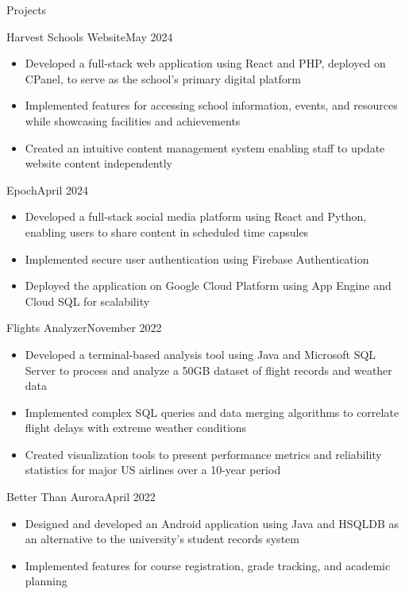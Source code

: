 \documentclass{article}
\newlength{\tabin}
\newlength{\secsep}
\newcommand{\lineunder}{\vspace*{-8pt} \\ \hspace*{-6pt} \hrulefill \\ \vspace*{-15pt}}
\newenvironment{tabbedsection}[1]{
	\begin{list}{}{
		\setlength{\itemsep}{0pt}
		\setlength{\labelsep}{0pt}
		\setlength{\labelwidth}{0pt}
		\setlength{\leftmargin}{\tabin}
		\setlength{\rightmargin}{\tabin}
		\setlength{\listparindent}{0pt}
		\setlength{\parsep}{0pt}
		\setlength{\parskip}{0pt}
		\setlength{\partopsep}{0pt}
		\setlength{\topsep}{#1}
	}
		\item[]
		}{
	\end{list}}
\newenvironment{resume_section}[1]{
	\vspace{2\secsep}
	\textsc{\large#1}
	\lineunder
	\begin{tabbedsection}{\secsep}
	}{\end{tabbedsection}}
\newenvironment{resume_subsection}[2]{
	\filbreak
	\begin{minipage}[t]{0.75\linewidth}
		\textbf{#1}
	\end{minipage}%
	\begin{minipage}[t]{0.25\linewidth}
		\hfill \footnotesize #2
	\end{minipage}
	\begin{tabbedsection}{0.5\secsep}
	}{\end{tabbedsection}}
\newenvironment{subitems}{
	\renewcommand{\labelitemi}{-}
	\begin{itemize}
		\setlength{\labelsep}{1em}
		}{
	\end{itemize}}
\begin{document}
\begin{resume_section}{Projects}
		\begin{resume_subsection}{Harvest Schools Website}{May 2024}
			\begin{subitems}
				\item Developed a full-stack web application using React and PHP, deployed on CPanel, to serve as the school's primary digital platform
				\item Implemented features for accessing school information, events, and resources while showcasing facilities and achievements
				\item Created an intuitive content management system enabling staff to update website content independently
			\end{subitems}
		\end{resume_subsection}
		
		\begin{resume_subsection}{Epoch}{April 2024}
			\begin{subitems}
				\item Developed a full-stack social media platform using React and Python, enabling users to share content in scheduled time capsules
				\item Implemented secure user authentication using Firebase Authentication
				\item Deployed the application on Google Cloud Platform using App Engine and Cloud SQL for scalability
			\end{subitems}
		\end{resume_subsection}
		
		\begin{resume_subsection}{Flights Analyzer}{November 2022}
			\begin{subitems}
				\item Developed a terminal-based analysis tool using Java and Microsoft SQL Server to process and analyze a 50GB dataset of flight records and weather data
				\item Implemented complex SQL queries and data merging algorithms to correlate flight delays with extreme weather conditions
				\item Created visualization tools to present performance metrics and reliability statistics for major US airlines over a 10-year period
			\end{subitems}
		\end{resume_subsection}
		
		\begin{resume_subsection}{Better Than Aurora}{April 2022}
			\begin{subitems}
				\item Designed and developed an Android application using Java and HSQLDB as an alternative to the university's student records system
				\item Implemented features for course registration, grade tracking, and academic planning
			\end{subitems}
		\end{resume_subsection}
	\end{resume_section}
	
\end{document}
